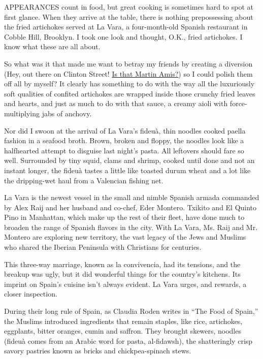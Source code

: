 APPEARANCES count in food, but great cooking is sometimes hard to spot
at first glance. When they arrive at the table, there is nothing
prepossessing about the fried artichokes served at La Vara, a
four-month-old Spanish restaurant in Cobble Hill, Brooklyn. I took one
look and thought, O.K., fried artichokes. I know what these are all
about.

So what was it that made me want to betray my friends by creating a
diversion (Hey, out there on Clinton Street!
\href{http://www.nytimes3xbfgragh.onion/2012/06/24/fashion/literary-brooklyn-gets-its-leading-man.html}{Is
that Martin Amis?}) so I could polish them off all by myself? It clearly
has something to do with the way all the luxuriously soft qualities of
confited artichokes are wrapped inside those crunchy fried leaves and
hearts, and just as much to do with that sauce, a creamy aioli with
force-multiplying jabs of anchovy.

Nor did I swoon at the arrival of La Vara's fideuà, thin noodles cooked
paella fashion in a seafood broth. Brown, broken and floppy, the noodles
look like a halfhearted attempt to disguise last night's pasta. All
leftovers should fare so well. Surrounded by tiny squid, clams and
shrimp, cooked until done and not an instant longer, the fideuà tastes a
little like toasted durum wheat and a lot like the dripping-wet haul
from a Valencian fishing net.

La Vara is the newest vessel in the small and nimble Spanish armada
commanded by Alex Raij and her husband and co-chef, Eder Montero.
Txikito and El Quinto Pino in Manhattan, which make up the rest of their
fleet, have done much to broaden the range of Spanish flavors in the
city. With La Vara, Ms. Raij and Mr. Montero are exploring new
territory, the vast legacy of the Jews and Muslims who shared the
Iberian Peninsula with Christians for centuries.

This three-way marriage, known as la convivencia, had its tensions, and
the breakup was ugly, but it did wonderful things for the country's
kitchens. Its imprint on Spain's cuisine isn't always evident. La Vara
urges, and rewards, a closer inspection.

During their long rule of Spain, as Claudia Roden writes in ``The Food
of Spain,'' the Muslims introduced ingredients that remain staples, like
rice, artichokes, eggplants, bitter oranges, cumin and saffron. They
brought skewers, noodles (fideuà comes from an Arabic word for pasta,
al-fidawsh), the shatteringly crisp savory pastries known as bricks and
chickpea-spinach stews.

